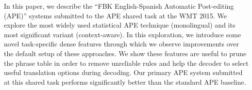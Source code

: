 In this paper, we describe the ``FBK English-Spanish Automatic Post-editing (APE)'' systems submitted to the APE shared task at the WMT 2015. We explore the most widely used statistical APE technique (monolingual) and its most significant variant (context-aware). In this exploration, we introduce some novel task-specific dense features through which we observe improvements over the default setup of these approaches. We show these features are useful to prune the phrase table in order to remove unreliable rules and help the decoder to select useful translation options during decoding. Our primary APE system submitted at this shared task performs significantly better than the standard APE baseline.
